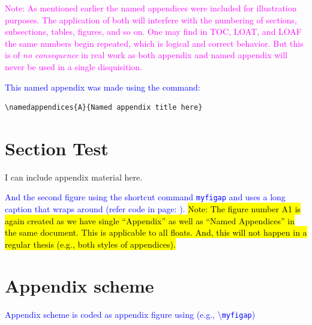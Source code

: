 \documentclass[phd,showgrids]{ndsu-thesis-2022}
\newcommand\italk[1]{\textcolor{blue}{#1}}  %
\newcommand\cmd[1]{\textbackslash\texttt{#1}}  %
\begin{document}
\textcolor{magenta}{Note: As mentioned earlier the named appendices were included for illustration purposes. The application of both will interfere with the numbering of sections, subsections, tables, figures, and so on. One may find in TOC, LOAT, and LOAF the same numbers begin repeated, which is logical and correct behavior. But this is of \emph{no consequence} in real work as both appendix and named appendix will never be used in a single disquisition.}

\italk{This named appendix was made using the command:}

\begin{verbatim}
\namedappendices{A}{Named appendix title here}
\end{verbatim}

\section{Section Test}

I can include appendix material here. 

\italk{And the second figure using the shortcut command \texttt{myfigap} and uses a long caption that wraps around (refer code in page: \pageref{figv}).} \hl{Note: The figure number A1 is again created as we have single ``Appendix'' as well as ``Named Appendices'' in the same document. This is applicable to all floats. And, this will not happen in a regular thesis (e.g., both styles of appendices).}


\kant[1]

\section{Appendix scheme}\label{appsch}

\italk{Appendix scheme is coded as appendix figure using (e.g., \cmd{myfigap})}

\end{document}
